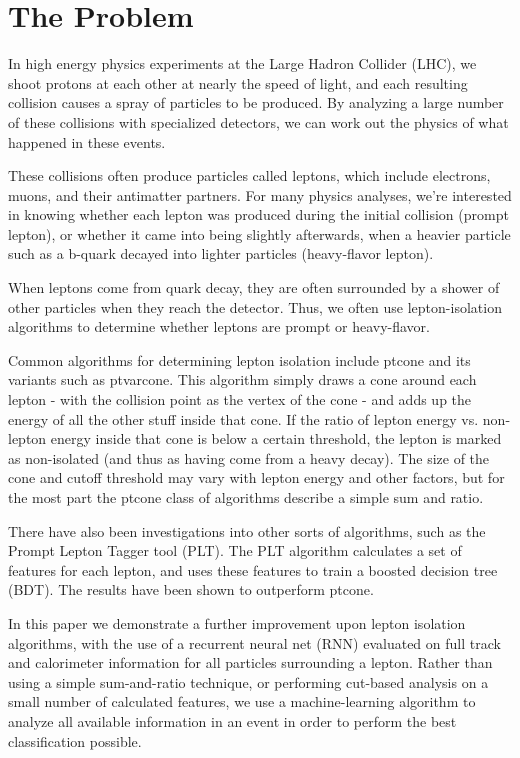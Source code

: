 \chapter{The Problem}


In high energy physics experiments at the Large Hadron Collider (LHC), we shoot protons at each other at nearly the speed of light, and each resulting collision causes a spray of particles to be produced. By analyzing a large number of these collisions with specialized detectors, we can work out the physics of what happened in these events.

These collisions often produce particles called leptons, which include electrons, muons, and their antimatter partners. For many physics analyses, we're interested in knowing whether each lepton was produced during the initial collision (prompt lepton), or whether it came into being slightly afterwards, when a heavier particle such as a b-quark decayed into lighter particles (heavy-flavor lepton).

When leptons come from quark decay, they are often surrounded by a shower of other particles when they reach the detector. Thus, we often use lepton-isolation algorithms to determine whether leptons are prompt or heavy-flavor.


Common algorithms for determining lepton isolation include ptcone and its variants such as ptvarcone. This algorithm simply draws a cone around each lepton - with the collision point as the vertex of the cone - and adds up the energy of all the other stuff inside that cone. If the ratio of lepton energy vs. non-lepton energy inside that cone is below a certain threshold, the lepton is marked as non-isolated (and thus as having come from a heavy decay). The size of the cone and cutoff threshold may vary with lepton energy and other factors, but for the most part the ptcone class of algorithms describe a simple sum and ratio.

There have also been investigations into other sorts of algorithms, such as the Prompt Lepton Tagger tool (PLT). The PLT algorithm calculates a set of features for each lepton, and uses these features to train a boosted decision tree (BDT). The results have been shown to outperform ptcone.


In this paper we demonstrate a further improvement upon lepton isolation algorithms, with the use of a recurrent neural net (RNN) evaluated on full track and calorimeter information for all particles surrounding a lepton. Rather than using a simple sum-and-ratio technique, or performing cut-based analysis on a small number of calculated features, we use a machine-learning algorithm to analyze all available information in an event in order to perform the best classification possible.

